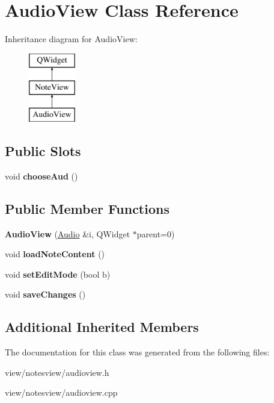 \hypertarget{class_audio_view}{\section{Audio\-View Class Reference}
\label{class_audio_view}
}
Inheritance diagram for Audio\-View\-:\begin{figure}[H]
\begin{center}
\leavevmode
\includegraphics[height=3.000000cm]{class_audio_view}
\end{center}
\end{figure}
\subsection*{Public Slots}
\begin{DoxyCompactItemize}
\item 
\hypertarget{class_audio_view_a7b3056c430a78ec2c4461548ef6db886}{void {\bfseries choose\-Aud} ()}\label{class_audio_view_a7b3056c430a78ec2c4461548ef6db886}

\end{DoxyCompactItemize}
\subsection*{Public Member Functions}
\begin{DoxyCompactItemize}
\item 
\hypertarget{class_audio_view_a1f60614292552f141e7877abaed1d830}{{\bfseries Audio\-View} (\hyperlink{class_audio}{Audio} \&i, Q\-Widget $\ast$parent=0)}\label{class_audio_view_a1f60614292552f141e7877abaed1d830}

\item 
\hypertarget{class_audio_view_a23ee25466d5f6b4d4917ebf5dcffbbf0}{void {\bfseries load\-Note\-Content} ()}\label{class_audio_view_a23ee25466d5f6b4d4917ebf5dcffbbf0}

\item 
\hypertarget{class_audio_view_ac36e1a8eb840e177a57b847cb013d6b4}{void {\bfseries set\-Edit\-Mode} (bool b)}\label{class_audio_view_ac36e1a8eb840e177a57b847cb013d6b4}

\item 
\hypertarget{class_audio_view_a928f01e885d73f0709d44977b22019f4}{void {\bfseries save\-Changes} ()}\label{class_audio_view_a928f01e885d73f0709d44977b22019f4}

\end{DoxyCompactItemize}
\subsection*{Additional Inherited Members}


The documentation for this class was generated from the following files\-:\begin{DoxyCompactItemize}
\item 
view/notesview/audioview.\-h\item 
view/notesview/audioview.\-cpp\end{DoxyCompactItemize}
